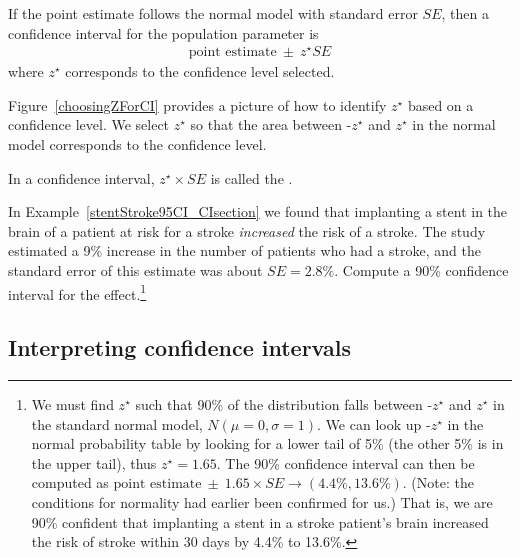 \begin{termBox}{
If the point estimate follows the normal model with standard error $SE$, then a confidence interval for the population parameter is
\begin{eqnarray*}
\text{point estimate}\ \pm\ z^{\star} SE
\end{eqnarray*}
where $z^{\star}$ corresponds to the confidence level selected.}
\end{termBox}

Figure~\ref{choosingZForCI} provides a picture of how to identify $z^{\star}$ based on a confidence level. We select $z^{\star}$ so that the area between -$z^{\star}$ and $z^{\star}$ in the normal model corresponds to the confidence level. 

\begin{termBox}{
\label{marginOfErrorTermBox}In a confidence interval, $z^{\star}\times SE$ is called the .}
\end{termBox}

\begin{exercise} \label{find90CIForRun10AgeExercise}
In Example~\ref{stentStroke95CI_CIsection} we found that implanting a stent in the brain of a patient at risk for a stroke \emph{increased} the risk of a stroke. The study estimated a 9\% increase in the number of patients who had a stroke, and the standard error of this estimate was about $SE = 2.8\%$. Compute a 90\% confidence interval for the effect.\footnote{We must find $z^{\star}$ such that 90\% of the distribution falls between -$z^{\star}$ and $z^{\star}$ in the standard normal model, $N(\mu=0, \sigma=1)$. We can look up -$z^{\star}$ in the normal probability table by looking for a lower tail of 5\% (the other 5\% is in the upper tail), thus $z^{\star}=1.65$. The 90\% confidence interval can then be computed as $\text{point estimate}\ \pm\ 1.65\times SE \to (4.4\%, 13.6\%)$. (Note: the conditions for normality had earlier been confirmed for us.) That is, we are 90\% confident that implanting a stent in a stroke patient's brain increased the risk of stroke within 30 days by 4.4\% to 13.6\%.}
\end{exercise}

\subsection{Interpreting confidence intervals}
\label{interpretingCIs}

